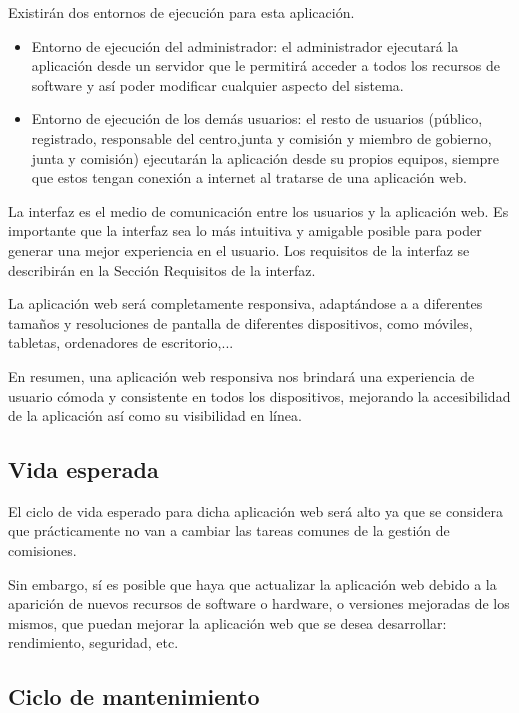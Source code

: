 Existirán dos entornos de ejecución para esta aplicación. 

 \begin{itemize}
     \item Entorno de ejecución del administrador:
         el administrador ejecutará la aplicación desde un servidor que le permitirá acceder a todos los recursos de software y así poder modificar cualquier aspecto del sistema.
     \item Entorno de ejecución de los demás usuarios:
         el resto de usuarios (público, registrado, responsable del centro,junta y comisión y miembro de gobierno, junta y comisión) ejecutarán la aplicación desde su propios equipos, siempre que estos tengan conexión a internet al tratarse de una aplicación web.
 \end{itemize}

 La interfaz es el medio de comunicación entre los usuarios y la aplicación web. Es importante que la interfaz sea lo más intuitiva y amigable posible para poder generar una mejor experiencia en el usuario. Los requisitos de la interfaz se describirán en la Sección Requisitos de la interfaz.

 La aplicación web será completamente responsiva, adaptándose a a diferentes tamaños y resoluciones de pantalla de diferentes dispositivos, como móviles, tabletas, ordenadores de escritorio,...

En resumen, una aplicación web responsiva nos brindará una experiencia de usuario cómoda y consistente en todos los dispositivos, mejorando la accesibilidad de la aplicación así como su visibilidad en línea.

        
\subsection{Vida esperada}
    
    El ciclo de vida esperado para dicha aplicación web será alto ya que se considera que prácticamente no van a cambiar las tareas comunes de la gestión de comisiones.
    
    Sin embargo, sí es posible que haya que actualizar la aplicación web debido a la aparición de nuevos recursos de software o hardware, o versiones mejoradas de los mismos, que puedan mejorar la aplicación web que se desea desarrollar: rendimiento, seguridad, etc.
    
\subsection{Ciclo de mantenimiento} \label{subsec:ciclo_mantenimiento}

